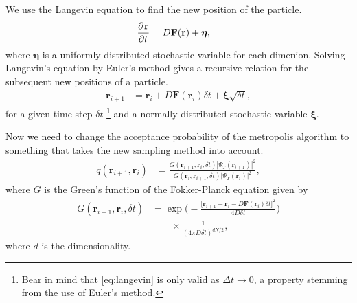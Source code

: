 \documentclass[
    a4paper, aps, twocolumn, floatfix, superscriptaddress,
    nofootinbib]{revtex4-1}
\newcommand{\vf}{\mathbf}
\newcommand{\vfg}{\boldsymbol}
\newcommand{\1}{\mathds{1}}
\begin{document}
            We use the Langevin equation to find the new position of the
            particle.
            \begin{align}
                \dpd[]{\vf{r}}{t}
                &=
                D\vf{F}(\vf{r}) + \vfg{\eta},
                \label{eq:langevin}
            \end{align}
            where $\vfg{\eta}$ is a uniformly distributed stochastic variable
            for each dimenion.  Solving Langevin's equation by Euler's method
            gives a recursive relation for the subsequent new positions of a
            particle.
            \begin{align}
                \vf{r}_{i + 1}
                &=
                \vf{r}_i + D\vf{F}(\vf{r}_i)\delta t
                + \vfg{\xi}\sqrt{\delta t},
            \end{align}
            for a given time step $\delta t$
            \footnote{
                Bear in mind that \autoref{eq:langevin} is only valid as $\Delta
                t \to 0$, a property stemming from the use of Euler's method.
            }
            and a normally distributed stochastic variable $\vfg{\xi}$.

            Now we need to change the acceptance probability of the metropolis
            algorithm to something that takes the new sampling method into
            account.
            \begin{align}
                q(\vf{r}_{i + 1}, \vf{r}_i)
                &=
                \frac{
                    G(\vf{r}_{i + 1}, \vf{r}_{i}, \delta t)
                    \left|\Psi_T(\vf{r}_{i + 1})\right|^2
                }
                {
                    G(\vf{r}_{i}, \vf{r}_{i + 1}, \delta t)
                    \left|\Psi_T(\vf{r}_{i})\right|^2
                },
            \end{align}
            where $G$ is the Green's function of the Fokker-Planck equation
            given by
            \begin{align}
                G(\vf{r}_{i + 1}, \vf{r}_i, \delta t)
                &=
                \exp\Biggl(
                    -\frac{\bigl[
                        \vf{r}_{i + 1}
                        - \vf{r}_{i}
                        - D\vf{F}(\vf{r}_i)\delta t
                    \bigr]^2}{4D\delta t}
                \Biggr)
                \nonumber \\
                &\qquad
                \times
                \frac{1}{(4\pi D\delta t)^{dN/2}},
            \end{align}
            where $d$ is the dimensionality.
\end{document}
